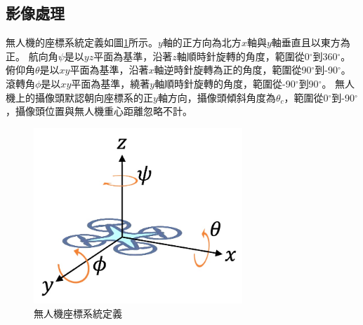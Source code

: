 \documentclass[12pt]{article}       %
\begin{document}
\subsection{影像處理}
\hspace{2em}無人機的座標系統定義如圖\ref{fig:xyzppr}所示。$y$軸的正方向為北方$x$軸與$y$軸垂直且以東方為正。
航向角$\psi$是以$yz$平面為基準，沿著$z$軸順時針旋轉的角度，範圍從0$^\circ$到360$^\circ$。
俯仰角$\theta$是以$xy$平面為基準，沿著$x$軸逆時針旋轉為正的角度，範圍從90$^\circ$到-90$^\circ$。
滾轉角$\phi$是以$xy$平面為基準，繞著$y$軸順時針旋轉的角度，範圍從-90$^\circ$到90$^\circ$。
無人機上的攝像頭默認朝向座標系的正$y$軸方向，攝像頭傾斜角度為$\theta_{c}$，範圍從0$^\circ$到-90$^\circ$，攝像頭位置與無人機重心距離忽略不計。
\begin{figure}[H]
    \centering
    \includegraphics[width=0.7\textwidth]{xyzppr.jpg}     %
    \caption{無人機座標系統定義}    %
    \label{fig:xyzppr}    %
\end{figure}
\end{document}

